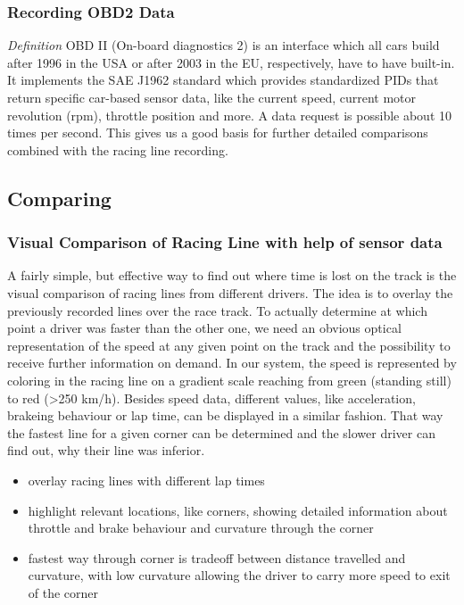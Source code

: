 \subsubsection{Recording OBD2 Data}
\textit{Definition} OBD II (On-board diagnostics 2) is an interface which all cars build after 1996 in the USA or after 2003 in the EU, respectively, have to have built-in. It implements the SAE J1962 standard which provides standardized PIDs that return specific car-based sensor data, like the current speed, current motor revolution (rpm), throttle position and more.
A data request is possible about 10 times per second. This gives us a good basis for further detailed comparisons combined with the racing line recording.

\subsection{Comparing}
\subsubsection{Visual Comparison of Racing Line with help of sensor data}
A fairly simple, but effective way to find out where time is lost on the track is the visual comparison of racing lines from different drivers. The idea is to overlay the previously recorded lines over the race track. To actually determine at which point a driver was faster than the other one, we need an obvious optical representation of the speed at any given point on the track and the possibility to receive further information on demand.
In our system, the speed is represented by coloring in the racing line on a gradient scale reaching from green (standing still) to red (>250 km/h).
Besides speed data, different values, like acceleration, brakeing behaviour or lap time, can be displayed in a similar fashion. That way the fastest line for a given corner can be determined and the slower driver can find out, why their line was inferior.

\begin{itemize}
  \item overlay racing lines with different lap times
  \item highlight relevant locations, like corners, showing detailed information about throttle and brake behaviour and curvature through the corner
  \item fastest way through corner is tradeoff between distance travelled and curvature, with low curvature allowing the driver to carry more speed to exit of the corner
\end{itemize}

